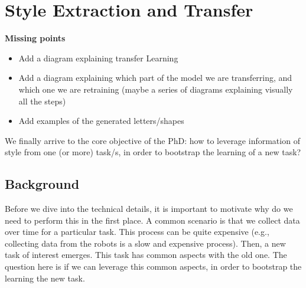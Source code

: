 \chapter{Style Extraction and Transfer} \label{ch:seat}
\minitoc%

\textbf{Missing points}
\begin{itemize}
  \item Add a diagram explaining transfer Learning
  \item Add a diagram explaining which part of the model we are transferring, and which one we are retraining (maybe a series of diagrams explaining visually all the steps)
  \item Add examples of the generated letters/shapes
\end{itemize}

\par We finally arrive to the core objective of the PhD: how to leverage information of style from one (or more) task/s, in order to bootstrap the learning of a new task?

\clearpage

\section{Background}

  \par Before we dive into the technical details, it is important to motivate why do we need to perform this in the first place. A common scenario is that we collect data over time for a particular task. This process can be quite expensive (e.g., collecting data from the robots is a slow and expensive process). Then, a new task of interest emerges. This task has common aspects with the old one. The question here is if we can leverage this common aspects, in order to bootstrap the learning the new task.


